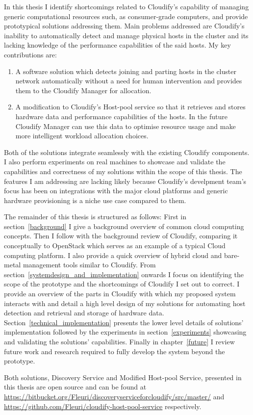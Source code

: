 In this thesis I identify shortcomings related to Cloudify's capability of managing generic computational resources such, as consumer-grade computers, and provide prototypical solutions addressing them. Main problems addressed are Cloudify's inability to automatically detect and manage physical hosts in the cluster and its lacking knowledge of the performance capabilities of the said hosts. My key contributions are:

\begin{enumerate}
\item  A software solution which detects joining and parting hosts in the cluster network automatically without a need for human intervention and provides them to the Cloudify Manager for allocation.
\item A modification to Cloudify's Host-pool service so that it retrieves and stores hardware data and performance capabilities of the hosts. In the future Cloudify Manager can use this data to optimise resource usage and make more intelligent workload allocation choices.
\end{enumerate}

Both of the solutions integrate seamlessly with the existing Cloudify components. I also perform experiments on real machines to showcase and validate the capabilities and correctness of my solutions within the scope of this thesis. The features I am addressing are lacking likely because Cloudify's develpment team's focus has been on integrations with the major cloud platforms and generic hardware provisioning is a niche use case compared to them.

The remainder of this thesis is structured as follows: First in section~\ref{background} I give a background overview of common cloud computing concepts. Then I follow with the background review of Cloudify, comparing it conceptually to OpenStack which serves as an example of a typical Cloud computing platform. I also provide a quick overview of hybrid cloud and bare-metal management tools similar to Cloudify.
From section~\ref{systemdesign_and_implementation} onwards I focus on identifying the scope of the prototype and the shortcomings of Cloudify I set out to correct. I provide an overview of the parts in Cloudify with which my proposed system interacts with and detail a high level design of my solutions for automating host detection and retrieval and storage of hardware data. Section~\ref{technical_implementation} presents the lower level details of solutions' implementation followed by the experiments in section~\ref{experiments} showcasing and validating the solutions' capabilities. Finally in chapter~\ref{future} I review future work and research required to fully develop the system beyond the prototype.

Both solutions, Discovery Service and Modified Host-pool Service, presented in this thesis are open source and can be found at \url{https://bitbucket.org/Fleuri/discoveryserviceforcloudify/src/master/}  and \url{https://github.com/Fleuri/cloudify-host-pool-service} respectively.

\pagebreak